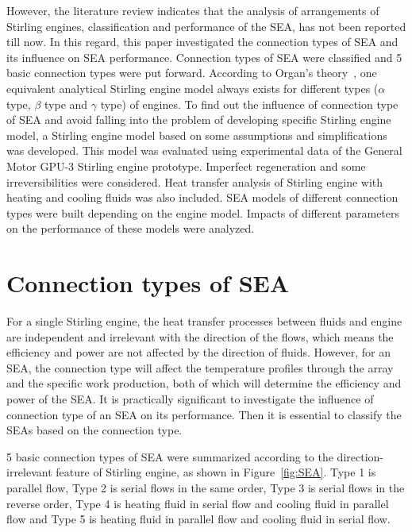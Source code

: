 \documentclass[preprint,5p, twocolumn]{elsarticle}
\begin{document}
However, the literature review indicates that the analysis of arrangements of Stirling engines, classification and performance of the SEA, has not been reported till now. In this regard, this paper investigated the connection types of SEA and its influence on SEA performance. Connection types of SEA were classified and 5 basic connection types were put forward. According to Organ's theory~\cite{Organ1997}, one equivalent analytical Stirling engine model always exists for different types ($\alpha$ type, $\beta$ type and $\gamma$ type) of engines. To find out the influence of connection type of SEA and avoid falling into the problem of developing specific Stirling engine model, a Stirling engine model based on some assumptions and simplifications was developed. This model was evaluated using experimental data of the General Motor GPU-3 Stirling engine prototype. Imperfect regeneration and some irreversibilities were considered. Heat transfer analysis of Stirling engine with heating and cooling fluids was also included. SEA models of different connection types were built depending on the engine model. Impacts of different parameters on the performance of these models were analyzed.

\section{Connection types of SEA}
For a single Stirling engine, the heat transfer processes between fluids and engine are independent and irrelevant with the direction of the flows, which means the efficiency and power are not affected by the direction of fluids. However, for an SEA, the connection type will affect the temperature profiles through the array and the specific work production, both of which will determine the efficiency and power of the SEA. It is practically significant to investigate the influence of connection type of an SEA on its performance. Then it is essential to classify the SEAs based on the connection type.

5 basic connection types of SEA were summarized according to the direction-irrelevant feature of Stirling engine, as shown in Figure~\ref{fig:SEA}. Type 1 is parallel flow, Type 2 is serial flows in the same order, Type 3 is serial flows in the reverse order, Type 4 is heating fluid in serial flow and cooling fluid in parallel flow and Type 5 is heating fluid in parallel flow and cooling fluid in serial flow.
\end{document}
